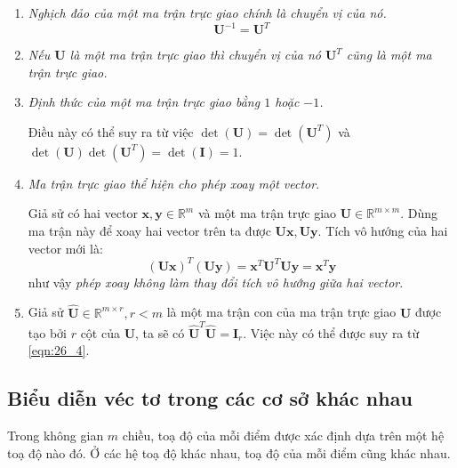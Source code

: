 \begin{enumerate}
	
	\item \textit{Nghịch đảo của một ma trận trực giao chính là chuyển vị của
		nó.}
	\begin{equation*}
	\mathbf{U}^{-1} = \mathbf{U}^T
	\end{equation*}
	\item \textit{Nếu $\mathbf{U}$ là một ma trận trực giao thì chuyển vị của nó
		$\mathbf{U}^T$ cũng là một ma trận trực giao.}
	\item \textit{Định thức của một ma trận trực giao bằng $1$ hoặc $-1$.}
	
	Điều này có thể suy ra từ việc $\det(\mathbf{U}) = \det(\mathbf{U}^T)$ và
	$\det(\mathbf{U}) \det(\mathbf{U}^T) = \det(\mathbf{I}) = 1$.
	
	\item \textit{Ma trận trực giao thể hiện cho phép xoay một vector}.
	
	Giả sử có hai vector $\mathbf{x,y} \in \mathbb{R}^m$ và một ma trận trực
	giao $\mathbf{U} \in \mathbb{R}^{m \times m}$. Dùng ma trận này để xoay hai
	vector trên ta được $\mathbf{Ux}, \mathbf{Uy}$. Tích vô hướng của hai vector
	mới là:
	\begin{equation*}
	(\mathbf{Ux})^T (\mathbf{Uy}) = \mathbf{x}^T \mathbf{U}^T \mathbf{Uy} = \mathbf{x}^T\mathbf{y}
	\end{equation*}
	như vậy \textit{phép xoay không làm thay đổi tích vô hướng giữa hai vector}.
	
	\item Giả sử $\hat{\mathbf{U}} \in \mathbb{R}^{m \times r}, r < m$ là một ma
	trận con của ma trận trực giao $\mathbf{U}$ được tạo bởi $r$ cột của
	$\mathbf{U}$, ta sẽ có $\hat{\mathbf{U}}^T\hat{\mathbf{U}} =
	\mathbf{I}_{r}$. Việc này có thể được suy ra từ \eqref{eqn:26_4}.
	
\end{enumerate}
\subsection{Biểu diễn véc tơ trong các cơ sở khác nhau}

Trong không gian $m$ chiều, toạ độ của mỗi điểm được xác định dựa trên một hệ
toạ độ nào đó. Ở các hệ toạ độ khác nhau, toạ độ của mỗi điểm cũng khác nhau.

